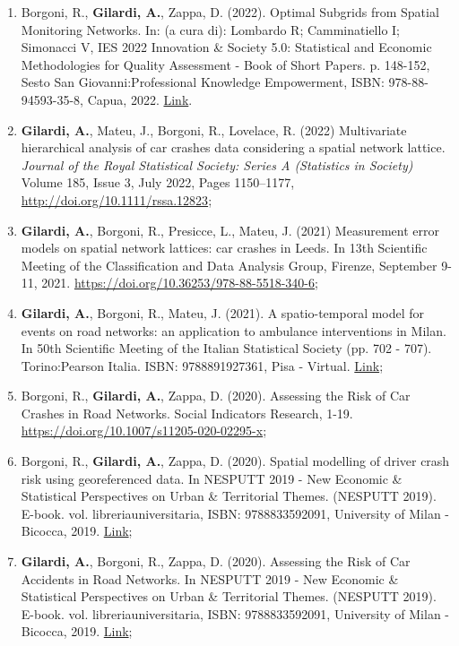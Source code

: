 \documentclass[11pt,a4paper,sans]{moderncv}
\begin{document}
\begin{enumerate}
  \item Borgoni, R., \textbf{Gilardi, A.}, Zappa, D. (2022). Optimal Subgrids from Spatial Monitoring Networks. In: (a cura di): Lombardo R; Camminatiello I; Simonacci V, IES 2022 Innovation \& Society 5.0: Statistical and Economic Methodologies for Quality Assessment - Book of Short Papers. p. 148-152, Sesto San Giovanni:Professional Knowledge Empowerment, ISBN: 978-88-94593-35-8, Capua, 2022.  \href{https://drive.google.com/file/d/1HEZG50lecMyx_NDRLi2Y7d0papiX9ZWO/view}{Link}.
  \item \textbf{Gilardi, A.}, Mateu, J., Borgoni, R., Lovelace, R. (2022) Multivariate hierarchical analysis of car crashes data considering a spatial network lattice. \textit{Journal of the Royal Statistical Society: Series A (Statistics in Society)} Volume 185, Issue 3, July 2022, Pages 1150–1177, \url{http://doi.org/10.1111/rssa.12823};
  \item \textbf{Gilardi, A.}, Borgoni, R., Presicce, L., Mateu, J. (2021) Measurement error models on spatial network lattices: car crashes in Leeds. In 13th Scientific Meeting of the Classification and Data Analysis Group, Firenze, September 9-11, 2021. \url{https://doi.org/10.36253/978-88-5518-340-6}; 
  \item \textbf{Gilardi, A.}, Borgoni, R., Mateu, J. (2021). A spatio-temporal model for events on road networks: an application to ambulance interventions in Milan. In 50th Scientific Meeting of the Italian Statistical Society (pp. 702 - 707). Torino:Pearson Italia. ISBN: 9788891927361, Pisa - Virtual. \href{https://it.pearson.com/content/dam/region-core/italy/pearson-italy/pdf/Docenti/Universit%C3%A0/pearson-sis-book-2021-parte-1.pdf}{Link}; 
  \item Borgoni, R., \textbf{Gilardi, A.}, Zappa, D. (2020). Assessing the Risk of Car Crashes in Road Networks. Social Indicators Research, 1-19. \url{https://doi.org/10.1007/s11205-020-02295-x};
  \item Borgoni, R., \textbf{Gilardi, A.}, Zappa, D. (2020). Spatial modelling of driver crash risk using georeferenced data. In NESPUTT 2019 - New Economic \& Statistical Perspectives on Urban \& Territorial Themes. (NESPUTT 2019). E-book. vol. libreriauniversitaria, ISBN: 9788833592091, University of Milan - Bicocca, 2019. \href{https://www.libreriauniversitaria.it/ebook/9788833592091/autore-riccardo-borgoni/new-economic-statistical-perspectives-on-urban-and-territorial-themes-nesputt-2019-e-book.htm}{Link};
  \item \textbf{Gilardi, A.}, Borgoni, R., Zappa, D. (2020). Assessing the Risk of Car Accidents in Road Networks. In NESPUTT 2019 - New Economic \& Statistical Perspectives on Urban \& Territorial Themes. (NESPUTT 2019). E-book. vol. libreriauniversitaria, ISBN: 9788833592091, University of Milan - Bicocca, 2019.  \href{https://www.libreriauniversitaria.it/ebook/9788833592091/autore-riccardo-borgoni/new-economic-statistical-perspectives-on-urban-and-territorial-themes-nesputt-2019-e-book.htm}{Link};

\end{enumerate}
\end{document}
